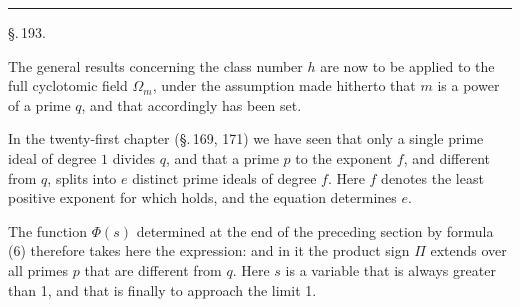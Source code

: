 
\begin{center}


\rule{4em}{0.4pt}
\end{center}

\begin{center}
\S.\,193.

\end{center}

The general results concerning the class number $h$ are now to
be applied to the full cyclotomic field $\Omega_m$, under the
assumption made hitherto that $m$ is a power of a prime
$q$, and that accordingly
has been set.

In the twenty-first chapter (\S.\,169, 171) we have seen
that only a single prime ideal of degree $1$ divides $q$, and
that a prime $p$  to the exponent $f$, and
different from $q$, splits into $e$ distinct prime ideals of degree $f$.
Here $f$ denotes the least positive exponent for which
holds, and the equation
determines $e$.

The function $\varPhi(s)$ determined at the end of the preceding
section by formula (6) therefore takes here the expression:
and in it the product sign $\varPi$ extends over all primes
 $p$ that are different from $q$. Here $s$ is a variable
that is always greater than 1, and that is finally to approach
the limit 1.
